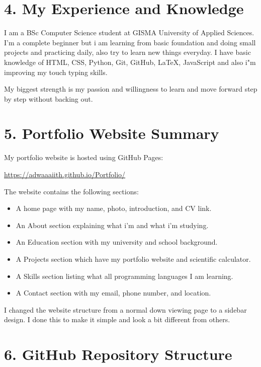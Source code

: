\documentclass[12pt,a4paper]{article}
\begin{document}
\section{4. My Experience and Knowledge}

I am a BSc Computer Science student at GISMA University of Applied Sciences. I'm a complete beginner but i am learning from basic foundation and doing small projects and practicing daily, also try to learn new things everyday. I have basic knowledge of HTML, CSS, Python, Git, GitHub, LaTeX, JavaScript and also i"m improving my touch typing skills.

My biggest strength is my passion and willingness to learn and move forward step by step without backing out. 

\section{5. Portfolio Website Summary}

My portfolio website is hosted using GitHub Pages:

\href{https://adwaaaiith.github.io/Portfolio/}{https://adwaaaiith.github.io/Portfolio/}

The website contains the following sections:

\begin{itemize}[leftmargin=*]
    \item A home page with my name, photo, introduction, and CV link.
    \item An About section explaining what i'm and what i'm studying.
    \item An Education section with my university and school background.
    \item A Projects section which have my portfolio website and scientific calculator.
    \item A Skills section listing what all programming languages I am learning.
    \item A Contact section with my email, phone number, and location.
\end{itemize}

I changed the website structure from a normal down viewing page to a sidebar design. I done this to make it simple and look a bit different from others.

\section{6. GitHub Repository Structure}
\end{document}
